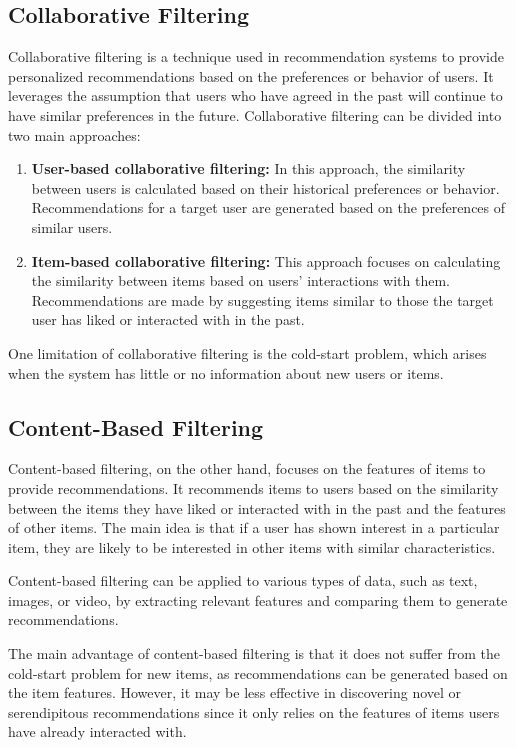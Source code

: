 \documentclass[12pt]{article}
\begin{document}
\subsection{Collaborative Filtering}
Collaborative filtering is a technique used in recommendation systems to provide personalized recommendations based on the preferences or behavior of users. It leverages the assumption that users who have agreed in the past will continue to have similar preferences in the future. Collaborative filtering can be divided into two main approaches:
\begin{enumerate}
\item \textbf{User-based collaborative filtering:} In this approach, the similarity between users is calculated based on their historical preferences or behavior. Recommendations for a target user are generated based on the preferences of similar users.
\item \textbf{Item-based collaborative filtering:} This approach focuses on calculating the similarity between items based on users' interactions with them. Recommendations are made by suggesting items similar to those the target user has liked or interacted with in the past.
\end{enumerate}
One limitation of collaborative filtering is the cold-start problem, which arises when the system has little or no information about new users or items.

\subsection{Content-Based Filtering}
Content-based filtering, on the other hand, focuses on the features of items to provide recommendations. It recommends items to users based on the similarity between the items they have liked or interacted with in the past and the features of other items. The main idea is that if a user has shown interest in a particular item, they are likely to be interested in other items with similar characteristics.

Content-based filtering can be applied to various types of data, such as text, images, or video, by extracting relevant features and comparing them to generate recommendations.

The main advantage of content-based filtering is that it does not suffer from the cold-start problem for new items, as recommendations can be generated based on the item features. However, it may be less effective in discovering novel or serendipitous recommendations since it only relies on the features of items users have already interacted with.
\end{document}
